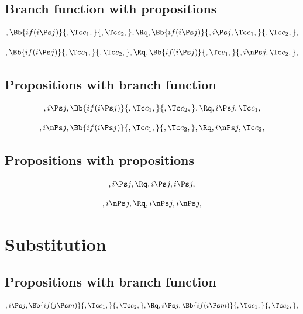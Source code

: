 \bigskip
\bigskip
\bigskip
\bigskip
\subsection{Branch function with propositions}
\[, \Bb{if(i \Ps j)}{,\Tc c_1,}{,\Tc c_2,}, \Rq , \Bb{if(i \Ps j)}{,i \Ps j,\Tc c_1,}{,\Tc c_2,},\]

\[, \Bb{if(i \Ps j)}{,\Tc c_1,}{,\Tc c_2,}, \Rq , \Bb{if(i \Ps j)}{,\Tc c_1,}{,i \nPs j,\Tc c_2,},\]

\bigskip
\bigskip
\bigskip
\bigskip
\subsection{Propositions with branch function}
\[,i \Ps j, \Bb{if(i \Ps j)}{,\Tc c_1,}{,\Tc c_2,}, \Rq , i \Ps j, \Tc c_1,\]

\[,i \nPs j, \Bb{if(i \Ps j)}{,\Tc c_1,}{,\Tc c_2,}, \Rq , i \nPs j, \Tc c_2,\]
\bigskip
\bigskip
\bigskip
\bigskip
\subsection{Propositions with propositions}
\[,i \Ps j, \Rq , i \Ps j, i \Ps j,\]

\[,i \nPs j, \Rq , i \nPs j, i \nPs j,\]


\bigskip
\bigskip
\bigskip
\bigskip
\section{Substitution}
\subsection{Propositions with branch function}
\[,i \Ps j, \Bb{if(j \Ps m)}{,\Tc c_1,}{,\Tc c_2,}, \Rq ,i \Ps j, \Bb{if(i \Ps m)}{,\Tc c_1,}{,\Tc c_2,}, \]

